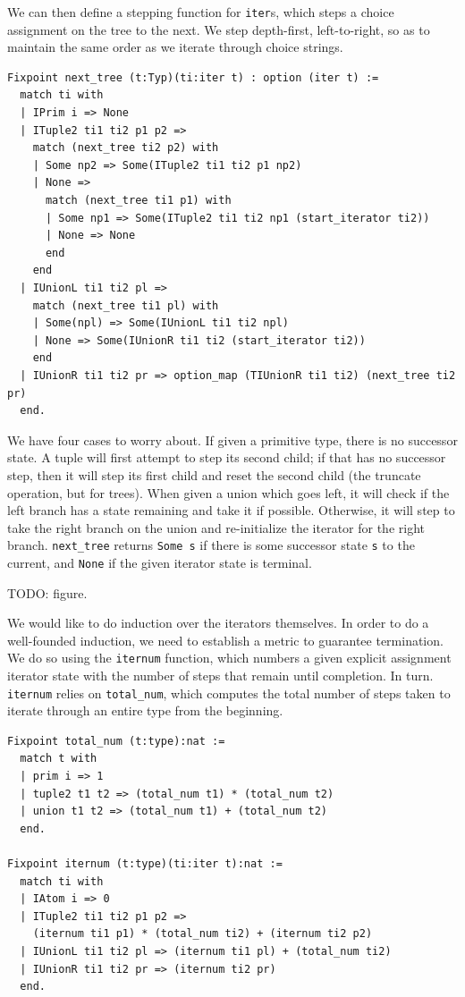 \documentclass[a4paper,english]{lipics-v2019}
\begin{document}
We can then define a stepping function for \verb|iter|s, which
steps a choice assignment on the tree to the next. We step depth-first,
left-to-right, so as to maintain the same order as we iterate through 
choice strings.

\begin{verbatim}
Fixpoint next_tree (t:Typ)(ti:iter t) : option (iter t) :=
  match ti with
  | IPrim i => None
  | ITuple2 ti1 ti2 p1 p2 =>
    match (next_tree ti2 p2) with
    | Some np2 => Some(ITuple2 ti1 ti2 p1 np2)
    | None =>
      match (next_tree ti1 p1) with
      | Some np1 => Some(ITuple2 ti1 ti2 np1 (start_iterator ti2))
      | None => None
      end
    end
  | IUnionL ti1 ti2 pl =>
    match (next_tree ti1 pl) with
    | Some(npl) => Some(IUnionL ti1 ti2 npl)
    | None => Some(IUnionR ti1 ti2 (start_iterator ti2))
    end
  | IUnionR ti1 ti2 pr => option_map (TIUnionR ti1 ti2) (next_tree ti2 pr)
  end.
\end{verbatim}

We have four cases to worry about. If given a primitive type, there is no
successor state. A tuple will first attempt to step its second child; if  that
has no successor step, then it will step its first child and reset the second
child (the truncate operation, but for trees). When given a union which goes
left, it will check if the left branch has a state remaining and take it if
possible. Otherwise, it will step to take the right branch on the union and
re-initialize the iterator for the right branch. \verb|next_tree| returns
\verb|Some s| if there is some successor state \verb|s| to the current, and
\verb|None| if the given iterator state is terminal.

TODO: figure.

We would like to do induction over the iterators themselves. In order to do
a well-founded induction, we need to establish a metric to guarantee termination.
We do so using the \verb|iternum| function, which numbers a given explicit assignment
iterator state with the number of steps that remain until completion. In turn.
\verb|iternum| relies on \verb|total_num|, which computes the total number of
steps taken to iterate through an entire type from the beginning. 

\begin{small}\begin{verbatim}
Fixpoint total_num (t:type):nat :=
  match t with
  | prim i => 1
  | tuple2 t1 t2 => (total_num t1) * (total_num t2)
  | union t1 t2 => (total_num t1) + (total_num t2)
  end.

Fixpoint iternum (t:type)(ti:iter t):nat :=
  match ti with
  | IAtom i => 0
  | ITuple2 ti1 ti2 p1 p2 =>
    (iternum ti1 p1) * (total_num ti2) + (iternum ti2 p2)
  | IUnionL ti1 ti2 pl => (iternum ti1 pl) + (total_num ti2)
  | IUnionR ti1 ti2 pr => (iternum ti2 pr)
  end.
\end{verbatim}\end{small}
\end{document}
